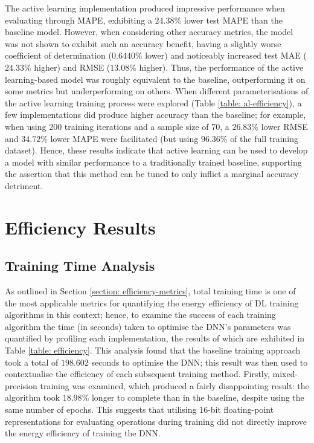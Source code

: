 \documentclass[a4paper, 11pt]{report}
\begin{document}
    The active learning implementation produced impressive performance when evaluating through MAPE, exhibiting a $24.38\%$ lower test MAPE than the baseline model. However, when considering other accuracy metrics, the model was not shown to exhibit such an accuracy benefit, having a slightly worse coefficient of determination ($0.6440\%$ lower) and noticeably increased test MAE ($24.33\%$ higher) and RMSE ($13.08\%$ higher). Thus, the performance of the active learning-based model was roughly equivalent to the baseline, outperforming it on some metrics but underperforming on others. When different parameterisations of the active learning training process were explored (Table \ref{table: al-efficiency}), a few implementations did produce higher accuracy than the baseline; for example, when using 200 training iterations and a sample size of 70, a $26.83\%$ lower RMSE and $34.72\%$ lower MAPE were facilitated (but using $96.36\%$ of the full training dataset). Hence, these results indicate that active learning can be used to develop a model with similar performance to a traditionally trained baseline, supporting the assertion that this method can be tuned to only inflict a marginal accuracy detriment.


    \section{Efficiency Results}

    \subsection{Training Time Analysis}

    As outlined in Section \ref{section: efficiency-metrics}, total training time is one of the most applicable metrics for quantifying the energy efficiency of DL training algorithms in this context; hence, to examine the success of each training algorithm the time (in seconds) taken to optimise the DNN's parameters was quantified by profiling each implementation, the results of which are exhibited in Table \ref{table: efficiency}. This analysis found that the baseline training approach took a total of $198.602$ seconds to optimise the DNN; this result was then used to contextualise the efficiency of each subsequent training method. Firstly, mixed-precision training was examined, which produced a fairly disappointing result: the algorithm took $18.98\%$ longer to complete than in the baseline, despite using the same number of epochs. This suggests that utilising 16-bit floating-point representations for evaluating operations during training did not directly improve the energy efficiency of training the DNN.
\end{document}
